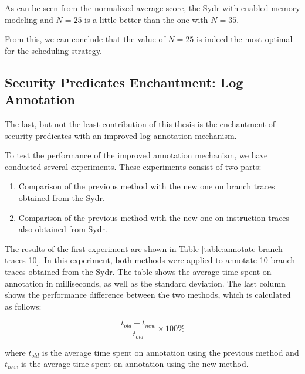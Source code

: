 As can be seen from the normalized average score, the Sydr with enabled memory modeling and $N=25$ is a little better than the one with $N=35$.

From this, we can conclude that the value of $N=25$ is indeed the most optimal for the scheduling strategy.

\subsection{Security Predicates Enchantment: Log Annotation} \label{results:security-invariants-enchantment-log-annotation}

The last, but not the least contribution of this thesis is the enchantment of security predicates with an improved log annotation mechanism.

To test the performance of the improved annotation mechanism, we have conducted several experiments. These experiments consist of two parts:

\begin{enumerate}
    \item Comparison of the previous method with the new one on branch traces obtained from the Sydr.
    \item Comparison of the previous method with the new one on instruction traces also obtained from Sydr.
\end{enumerate}

The results of the first experiment are shown in Table \ref{table:annotate-branch-traces-10}. In this experiment, both methods were applied to annotate 10 branch traces obtained from the Sydr. The table shows the average time spent on annotation in milliseconds, as well as the standard deviation. The last column shows the performance difference between the two methods, which is calculated as follows:

$$ \frac{t_{old} - t_{new}}{t_{old}} \times 100 \% $$

where $t_{old}$ is the average time spent on annotation using the previous method and $t_{new}$ is the average time spent on annotation using the new method.

